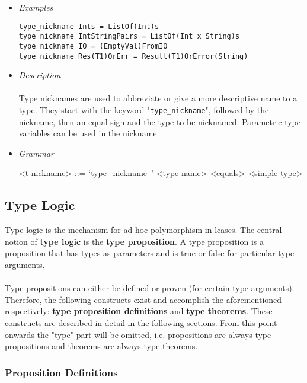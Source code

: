 \documentclass{article}
\begin{document}
\begin{itemize}

\item \textit{Examples}

\begin{verbatim}
type_nickname Ints = ListOf(Int)s
type_nickname IntStringPairs = ListOf(Int x String)s
type_nickname IO = (EmptyVal)FromIO
type_nickname Res(T1)OrErr = Result(T1)OrError(String)
\end{verbatim}

\item \textit{Description} \\\\
Type nicknames are used to abbreviate or give a more descriptive name to a
type.  They start with the keyword "\verb|type_nickname|", followed by the
nickname, then an equal sign and the type to be nicknamed.
Parametric type variables can be used in the nickname.

\item \textit{Grammar}

\begin{grammar}
<t-nickname> ::=
`type_nickname\ ' <type-name> <equals> <simple-type>
\end{grammar}

\end{itemize}

\newpage
\subsection{Type Logic}
\label{subsec:typelogic}

Type logic is the mechanism for ad hoc polymorphism in lcases. The central
notion of \textbf{type logic} is the \textbf{type proposition}. A type
proposition is a proposition that has types as parameters and is true or false
for particular type arguments.
\\\\
Type propositions can either be defined or proven (for certain type arguments).
Therefore, the following constructs exist and accomplish the aforementioned
respectively: \textbf{type proposition definitions} and \textbf{type theorems}.
These constructs are described in detail in the following sections. From this
point onwards the "type" part will be omitted, i.e. propositions are always
type propositions and theorems are always type theorems.

\subsubsection{Proposition Definitions}
\end{document}
